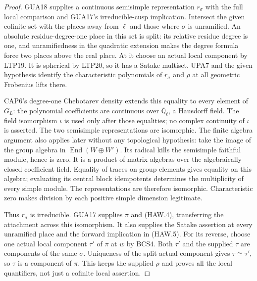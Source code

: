 \documentclass[11pt,a4paper]{article}
\numberwithin{equation}{section}
\theoremstyle{remark}\newtheorem{remark}[theorem]{Remark}
\begin{document}
\begin{proof}
GUA18 supplies a continuous semisimple representation $r_\sigma$
with the full local comparison and GUA17's irreducible-cusp
implication.  Intersect the given cofinite set with the places
away from $\ell$ and those where $\sigma$ is unramified.
An absolute residue-degree-one place in this set is split:
its relative residue degree is one, and unramifiedness in the
quadratic extension makes the degree formula force two places
above the real place.  At it choose an actual local component
by LTP19.  It is spherical by LTP20, so it has a Satake multiset.
UPA7 and the given hypothesis identify the characteristic
polynomials of $r_\sigma$ and $\rho$ at all geometric Frobenius
lifts there.

CAP6's degree-one Chebotarev density extends this equality to
every element of $G_L$: the polynomial coefficients are
continuous over $\overline{\mathbb Q}_\ell$, a Hausdorff field.
The field isomorphism $\iota$ is used only after those
equalities; no complex continuity of $\iota$ is asserted.
The two semisimple representations are isomorphic.  The finite
algebra argument also applies later without any topological
hypothesis: take the image of the group algebra in
$\operatorname{End}(W\oplus W')$.  Its radical kills the
semisimple faithful module, hence is zero.  It is a product of
matrix algebras over the algebraically closed coefficient field.
Equality of traces on group elements gives equality on this
algebra; evaluating its central block idempotents determines
the multiplicity of every simple module.  The representations
are therefore isomorphic.  Characteristic zero makes division
by each positive simple dimension legitimate.

Thus $r_\sigma$ is irreducible.  GUA17 supplies $\pi$ and
(HAW.4), transferring the attachment across this isomorphism.
It also supplies the Satake assertion at every unramified place
and the forward implication in (HAW.5).  For its reverse,
choose one actual local component $\tau'$ of $\pi$ at $w$
by BCS4.
Both $\tau'$ and the supplied $\tau$ are components of the same
$\sigma$.  Uniqueness of the split actual component gives
$\tau\simeq\tau'$, so $\tau$ is a component of $\pi$.
This keeps the supplied $\rho$ and proves all the local
quantifiers, not just a cofinite local assertion.
\end{proof}

\end{document}
